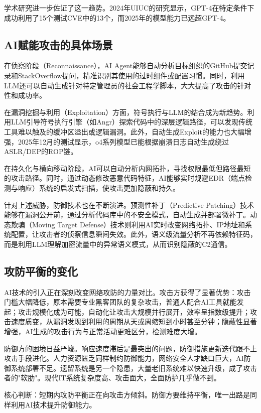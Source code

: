 学术研究进一步佐证了这一趋势。2024年UIUC的研究显示，GPT-4在特定条件下成功利用了15个测试CVE中的13个，而2025年的模型能力已远超GPT-4。

\subsection{AI赋能攻击的具体场景}

在侦察阶段（Reconnaissance），AI Agent能够自动分析目标组织的GitHub提交记录和StackOverflow提问，精准识别其使用的过时组件或配置习惯。同时，利用LLM还可以自动生成针对特定管理员的社会工程学脚本，大大提高了攻击的针对性和成功率。

在漏洞挖掘与利用（Exploitation）方面，符号执行与LLM的结合成为新趋势。利用LLM引导符号执行引擎（如Angr）探索代码中的深层逻辑路径，可以发现传统工具难以触及的缓冲区溢出或逻辑漏洞。此外，自动生成Exploit的能力也大幅增强，2025年12月的测试显示，o4系列模型已能根据崩溃日志自动生成绕过ASLR/DEP的ROP链。

在持久化与横向移动阶段，AI可以自动分析内网拓扑，寻找权限最低但路径最短的攻击路径。同时，通过动态修改恶意代码特征，AI能够实时规避EDR（端点检测与响应）系统的启发式扫描，使攻击更加隐蔽和持久。

针对上述威胁，防御技术也在不断演进。预测性补丁（Predictive Patching）技术能够在漏洞公开前，通过分析代码库中的不安全模式，自动生成并部署微补丁。动态欺骗（Moving Target Defense）技术则利用AI实时改变网络拓扑、IP地址和系统配置，让攻击者的侦察信息瞬间失效。此外，语义级流量分析不再依赖特征码，而是利用LLM理解加密流量中的异常语义模式，从而识别隐蔽的C2通信。

\subsection{攻防平衡的变化}

AI技术的引入正在深刻改变网络攻防的力量对比。攻击方获得了显著优势：攻击门槛大幅降低，原本需要专业黑客团队的复杂攻击，普通人配合AI工具就能发起；攻击规模化成为可能，自动化让攻击大规模并行展开，效率呈指数级提升；攻击速度质变，从漏洞发现到利用的周期从天或周缩短到小时甚至分钟；隐蔽性显著增强，AI生成的攻击行为与正常活动更难区分，检测难度大增。

防御方的困境日益严峻。响应速度滞后是最突出的问题，防御措施更新迭代跟不上攻击手段进化。人力资源匮乏同样制约防御能力，网络安全人才缺口巨大，AI防御系统部署不足。遗留系统是另一个隐患，大量老旧系统难以快速升级，成了攻击者的"软肋"。现代IT系统复杂度高、攻击面大，全面防护几乎做不到。

核心判断：短期内攻防平衡正在向攻击方倾斜。防御方要维持平衡，唯一出路是同样利用AI技术提升防御能力。


